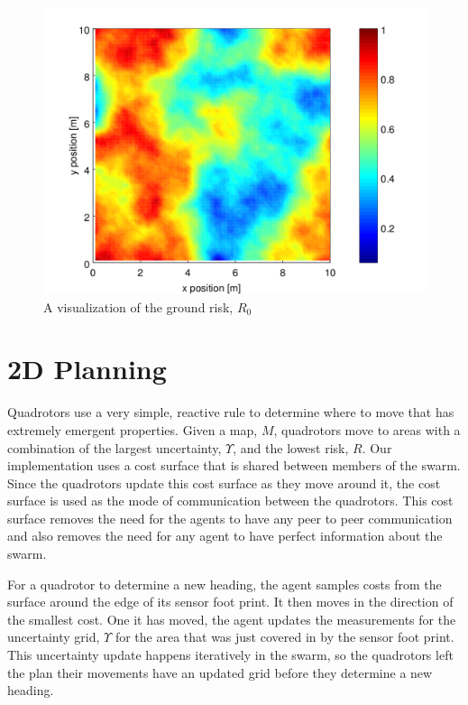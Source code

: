 \documentclass{article}
\begin{document}
\begin{figure}[h]

    \centering

    \includegraphics[width=1.0\columnwidth]{tasefigs/risk.png}

    \caption{A visualization of the ground risk, $R_0$}

    \label{fig:risk}

\end{figure}

\section{2D Planning}

Quadrotors use a very simple, reactive rule to determine where to move that has
extremely emergent properties.  Given a map, $M$, quadrotors move to areas with
a combination of the largest uncertainty, $\Upsilon$, and the lowest risk, $R$.
Our implementation uses a cost surface that is shared between members of the
swarm. Since the quadrotors update this cost surface as they move around it,
the cost surface is used as the mode of communication between the quadrotors.
This cost surface removes the need for the agents to have any peer to peer
communication and also removes the need for any agent to have perfect
information about the swarm.

For a quadrotor to determine a new heading, the agent samples costs from the
surface around the edge of its sensor foot print. It then moves in the
direction of the smallest cost. One it has moved, the agent updates the
measurements for the uncertainty grid, $\Upsilon$ for the area that was just
covered in by the sensor foot print. This uncertainty update happens
iteratively in the swarm, so the quadrotors left the plan their movements have
an updated grid before they determine a new heading.
\end{document}
